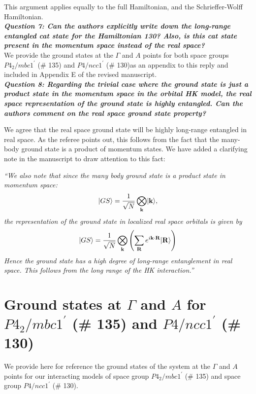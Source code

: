 \documentclass[aps,reprint,notitlepage,onecolumn,12pt]{revtex4-2}
\DeclarePairedDelimiter\ket{\lvert}{\rangle}%
\numberwithin{equation}{section}
\def\sg135{$P4_2/mbc1^\prime$ (\# 135)}
\def\sgb{$P4/ncc1^\prime$ (\# 130)}
\begin{document}
This argument applies equally to the full Hamiltonian, and the Schrieffer-Wolff Hamiltonian.\\

\textbf{\textit{Question 7: Can the authors explicitly write down the long-range entangled cat state for the Hamiltonian 130? Also, is this cat state present in the momentum space instead of the real space?}}\\

We provide the ground states at the $\Gamma$ and $A$ points for both space groups \sg135 and \sgb as an appendix to this reply and included in Appendix E of the revised manuscript.\\

\textbf{\textit{Question 8: Regarding the trivial case where the ground state is just a product state in the momentum space in the orbital HK model, the real space representation of the ground state is highly entangled. Can the authors comment on the real space ground state property?}}

We agree that the real space ground state will be highly long-range entangled in real space. 
As the referee points out, this follows from the fact that the many-body ground state is a product of momentum states.
We have added a clarifying note in the manuscript to draw attention to this fact:

\textit{
``We also note that since the many body ground state is a product state in momentum space:
\begin{equation}
    \ket{GS}=\frac{1}{\sqrt{N}}\bigotimes_{\mathbf{k}}\ket{\mathbf{k}},
\end{equation}
the representation of the ground state in localized real space orbitals is given by
\begin{equation}
\ket{GS}=\frac{1}{\sqrt{N}}\bigotimes_{\mathbf{k}}\left(\sum_{\mathbf{R}}e^{i\mathbf{k}\cdot\mathbf{R}}\ket{\mathbf{R}}\right)
\end{equation}
Hence the ground state has a high degree of long-range entanglement in real space. This follows from the long range of the HK interaction.''
}
\appendix
\clearpage

\section{Ground states at $\Gamma$ and $A$ for \sg135 and \sgb}
\label{sec:groundstates}
We\cite{lsm2023} provide here for reference the ground states of the system at the $\Gamma$ and $A$ points for our interacting models of space group \sg135 and space group \sgb.
\end{document}
